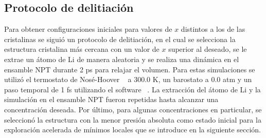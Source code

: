 \subsection{Protocolo de delitiación}

Para obtener configuraciones iniciales para valores de $x$ distintos a los de las 
cristalinas se siguió un protocolo de delitiación, en el cual se selecciona la 
estructura cristalina más cercana con un valor de $x$ superior al deseado,
se le extrae un átomo de Li de manera aleatoria y se realiza una dinámica en el 
ensamble NPT durante 2 ps para relajar el volumen. Para estas simulaciones se 
utilizó el termostato de Nosé-Hoover ~\cite{nose1984a, nose1984b, hoover1985} a
300.0 K, un barostato a 0.0 atm y un paso temporal de 1 fs utilizando el
software  ~\cite{lammps1, lammps2}. La extracción del átomo de Li y
la simulación en el ensamble NPT fueron repetidas hasta alcanzar una concentración
deseada. Por último, para algunas concentraciones en particular, se seleccionó la
estructura con la menor presión absoluta como estado inicial para la exploración 
acelerada de mínimos locales que se introduce en la siguiente sección.
